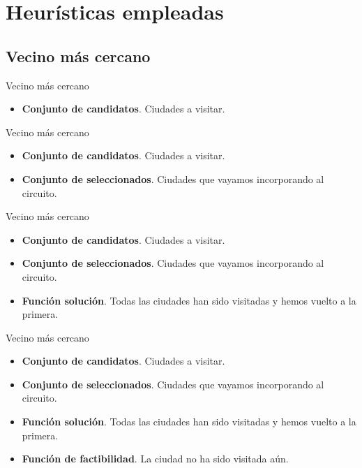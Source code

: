 \documentclass{beamer}
\begin{document}
\section{Heurísticas empleadas}

\subsection{Vecino más cercano}

\begin{frame}[fragile]{Vecino más cercano}

\begin{itemize}
	\item \textbf{Conjunto de candidatos}. Ciudades a visitar.
\end{itemize}

\end{frame}

\begin{frame}[fragile]{Vecino más cercano}

\begin{itemize}
	\item \textbf{Conjunto de candidatos}. Ciudades a visitar.
	\item \textbf{Conjunto de seleccionados}. Ciudades que vayamos incorporando al circuito.
\end{itemize}

\end{frame}

\begin{frame}[fragile]{Vecino más cercano}

\begin{itemize}
	\item \textbf{Conjunto de candidatos}. Ciudades a visitar.
	\item \textbf{Conjunto de seleccionados}. Ciudades que vayamos incorporando al circuito.
	\item \textbf{Función solución}. Todas las ciudades han sido visitadas y hemos vuelto a la primera.
\end{itemize}

\end{frame}

\begin{frame}[fragile]{Vecino más cercano}

\begin{itemize}
	\item \textbf{Conjunto de candidatos}. Ciudades a visitar.
	\item \textbf{Conjunto de seleccionados}. Ciudades que vayamos incorporando al circuito.
	\item \textbf{Función solución}. Todas las ciudades han sido visitadas y hemos vuelto a la primera.
	\item \textbf{Función de factibilidad}. La ciudad no ha sido visitada aún.
\end{itemize}

\end{frame}
\end{document}

